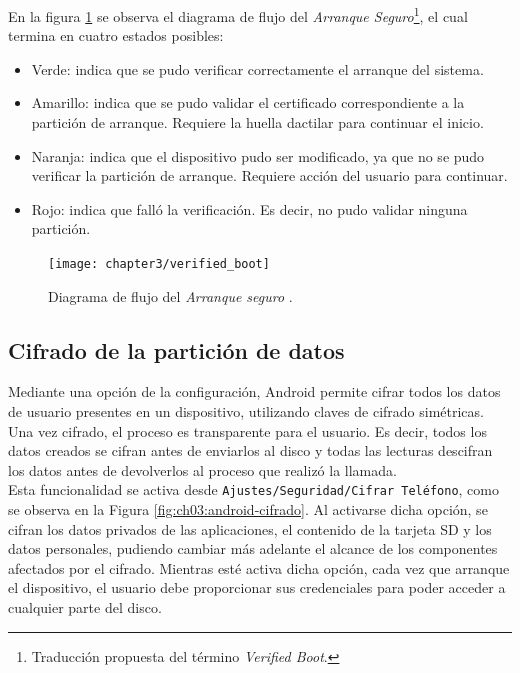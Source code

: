 En la figura \ref{fig:ch03:verifyBoot} se observa el diagrama de flujo del \textit{Arranque Seguro}\footnote{Traducción propuesta del término \textit{Verified Boot}.}, el cual termina en cuatro estados posibles:
\begin{itemize}
	\item Verde: indica que se pudo verificar correctamente el arranque del sistema.
	\item Amarillo: indica que se pudo validar el certificado correspondiente a la partición de arranque. Requiere la huella dactilar para continuar el inicio.
	\item Naranja: indica que el dispositivo pudo ser modificado, ya que no se pudo verificar la partición de arranque. Requiere acción del usuario para continuar.
	\item Rojo: indica que falló la verificación. Es decir, no pudo validar ninguna partición.
\end{itemize}
\begin{figure}[htbp]
	\begin{center}
		\texttt{[image: chapter3/verified\_boot]}
		\caption{Diagrama de flujo del \textit{Arranque seguro} \cite{asreview2015}.}
		\label{fig:ch03:verifyBoot}
	\end{center}
\end{figure}
\subsection{Cifrado de la partición de datos}
Mediante una opción de la configuración, Android permite cifrar todos los datos de usuario presentes en un dispositivo, utilizando claves de cifrado simétricas. Una vez cifrado, el proceso es transparente para el usuario. Es decir, todos los datos creados se cifran antes de enviarlos al disco y todas las lecturas descifran los datos antes de devolverlos al proceso que realizó la llamada.\\

Esta funcionalidad se activa desde \texttt{Ajustes/Seguridad/Cifrar Teléfono}, como se observa en la Figura \ref{fig:ch03:android-cifrado}. Al activarse dicha opción, se cifran los datos privados de las aplicaciones, el contenido de la tarjeta SD y los datos personales, pudiendo cambiar más adelante el alcance de los componentes afectados por el cifrado. Mientras esté activa dicha opción, cada vez que arranque el dispositivo, el usuario debe proporcionar sus credenciales para poder acceder a cualquier parte del disco.\\

